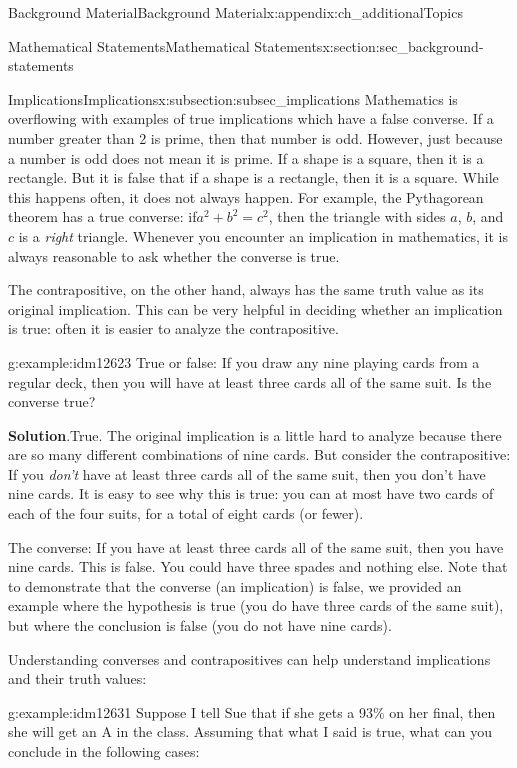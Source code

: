 \documentclass[oneside,10pt,]{book}
\numberwithin{equation}{chapter}
\begin{document}
\begin{appendixptx}{Background Material}{}{Background Material}{}{}{x:appendix:ch_additionalTopics}
\begin{sectionptx}{Mathematical Statements}{}{Mathematical Statements}{}{}{x:section:sec_background-statements}
\begin{subsectionptx}{Implications}{}{Implications}{}{}{x:subsection:subsec_implications}
Mathematics is overflowing with examples of true implications which have a false converse. If a number greater than 2 is prime, then that number is odd. However, just because a number is odd does not mean it is prime. If a shape is a square, then it is a rectangle. But it is false that if a shape is a rectangle, then it is a square. While this happens often, it does not always happen. For example, the Pythagorean theorem has a true converse: if\(a^2 + b^2 = c^2\), then the triangle with sides \(a\), \(b\), and \(c\) is a \emph{right} triangle. Whenever you encounter an implication in mathematics, it is always reasonable to ask whether the converse is true.%
\par
The contrapositive, on the other hand, always has the same truth value as its original implication. This can be very helpful in deciding whether an implication is true: often it is easier to analyze the contrapositive.%
\begin{example}{}{g:example:idm12623}%
True or false: If you draw any nine playing cards from a regular deck, then you will have at least three cards all of the same suit. Is the converse true?%
\par\smallskip%
\noindent\textbf{Solution}.\hypertarget{g:solution:idm12626}{}\quad{}True. The original implication is a little hard to analyze because there are so many different combinations of nine cards. But consider the contrapositive: If you \emph{don't} have at least three cards all of the same suit, then you don't have nine cards. It is easy to see why this is true: you can at most have two cards of each of the four suits, for a total of eight cards (or fewer).%
\par
The converse: If you have at least three cards all of the same suit, then you have nine cards. This is false. You could have three spades and nothing else. Note that to demonstrate that the converse (an implication) is false, we provided an example where the hypothesis is true (you do have three cards of the same suit), but where the conclusion is false (you do not have nine cards).%
\end{example}
Understanding converses and contrapositives can help understand implications and their truth values:%
\begin{example}{}{g:example:idm12631}%
Suppose I tell Sue that if she gets a 93\% on her final, then she will get an A in the class. Assuming that what I said is true, what can you conclude in the following cases:%
\par
%
\begin{enumerate}

\end{enumerate}
\end{example}
\end{subsectionptx}
\end{sectionptx}
\end{appendixptx}
\end{document}
